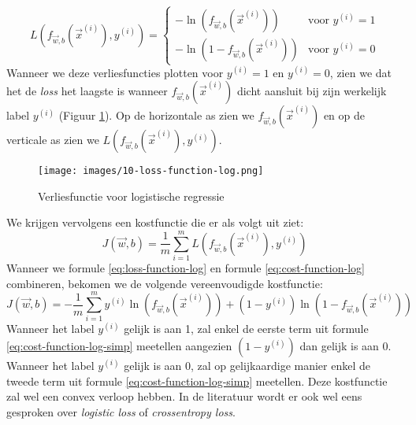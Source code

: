  \begin{equation}
 	L(f_{\vec{w},b}(\vec{x}^{(i)}), y^{(i)}) = \left\{ \begin{matrix} -\ln(f_{\vec{w},b}(\vec{x}^{(i)})) & \mbox{voor } y^{(i)} = 1 \\ -\ln(1 - f_{\vec{w},b}(\vec{x}^{(i)}))  & \mbox{voor } y^{(i)} = 0 \end{matrix}\right .
 	\label{eq:loss-function-log}
 \end{equation}
\noindent
Wanneer we deze verliesfuncties plotten voor $y^{(i)} = 1$ en $y^{(i)} = 0$, zien we dat het de \textit{loss} het laagste is wanneer $f_{\vec{w},b}(\vec{x}^{(i)})$ dicht aansluit bij zijn werkelijk label $y^{(i)}$ (Figuur \ref{fig:loss-function-log}). Op de horizontale as zien we $f_{\vec{w},b}(\vec{x}^{(i)})$ en op de verticale as zien we $L(f_{\vec{w},b}(\vec{x}^{(i)}), y^{(i)})$.

\begin{figure}[h]
	\centering
	\texttt{[image: images/10-loss-function-log.png]}
	\caption{Verliesfunctie voor logistische regressie}
	\label{fig:loss-function-log}
\end{figure}
\noindent
We krijgen vervolgens een kostfunctie die er als volgt uit ziet:
\begin{equation}
	J(\vec{w}, b) = \frac{1}{m} \sum_{i=1}^{m} L(f_{\vec{w},b}(\vec{x}^{(i)}), y^{(i)})
	\label{eq:cost-function-log}
\end{equation}
\noindent
Wanneer we formule \ref{eq:loss-function-log} en formule \ref{eq:cost-function-log} combineren, bekomen we de volgende vereenvoudigde kostfunctie:
\begin{equation}
	J(\vec{w}, b) = -\frac{1}{m} \sum_{i=1}^{m} y^{(i)}\ln(f_{\vec{w},b}(\vec{x}^{(i)})) + (1 - y^{(i)}) \ln(1 - f_{\vec{w},b}(\vec{x}^{(i)})) 
	\label{eq:cost-function-log-simp}
\end{equation}
\noindent
Wanneer het label $y^{(i)}$ gelijk is aan 1, zal enkel de eerste term uit formule \ref{eq:cost-function-log-simp} meetellen aangezien $(1 - y^{(i)})$ dan gelijk is aan 0. Wanneer het label $y^{(i)}$ gelijk is aan 0, zal op gelijkaardige manier enkel de tweede term uit formule \ref{eq:cost-function-log-simp} meetellen. Deze kostfunctie zal wel een convex verloop hebben. In de literatuur wordt er ook wel eens gesproken over \textit{logistic loss} of \textit{crossentropy loss}.

